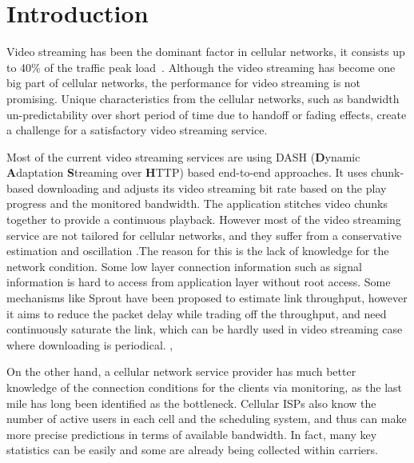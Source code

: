 \section{Introduction}
Video streaming has been the dominant factor in cellular networks, it consists
up to 40\% of the traffic peak load~\cite{LTENetwork, VideoMeasureatt}. Although
the video streaming has become one big part of cellular networks, the
performance for video streaming is not promising. Unique characteristics from
the cellular networks, such as bandwidth un-predictability over short period of
time due to handoff or fading effects, create a challenge for a satisfactory
video streaming service. 

Most of the current video streaming services are using DASH (\textbf{D}ynamic
\textbf{A}daptation \textbf{S}treaming over \textbf{H}TTP)\cite{DASH} based
end-to-end approaches. It uses chunk-based downloading and adjusts its video
streaming bit rate based on the play progress and the monitored bandwidth. The
application stitches video chunks together to provide a continuous playback.
However most of the video streaming service are not tailored for cellular networks, and they suffer from a conservative estimation and oscillation\cite{BBA,Festive, QDASH} .The reason for this is the lack of knowledge for the network condition. 
Some low layer connection information such as signal information is hard to access from application layer without root access.
Some mechanisms like Sprout\cite{Sprout} have been proposed to estimate link throughput, however it aims to reduce the packet delay while trading off the throughput, and need continuously saturate the link, which can be hardly used in video streaming case where downloading is periodical\cite{OnOff}.   
, 

On the other hand, a cellular network service provider has much better knowledge of the connection
conditions for the clients via monitoring, as the last mile has long been identified as the
bottleneck\cite{LASTMILE}. Cellular ISPs also know the number of
active users in each cell and the scheduling system, and thus can make more
precise predictions in terms of available bandwidth. In fact, many key statistics can be easily and some are
already being collected within carriers. 

